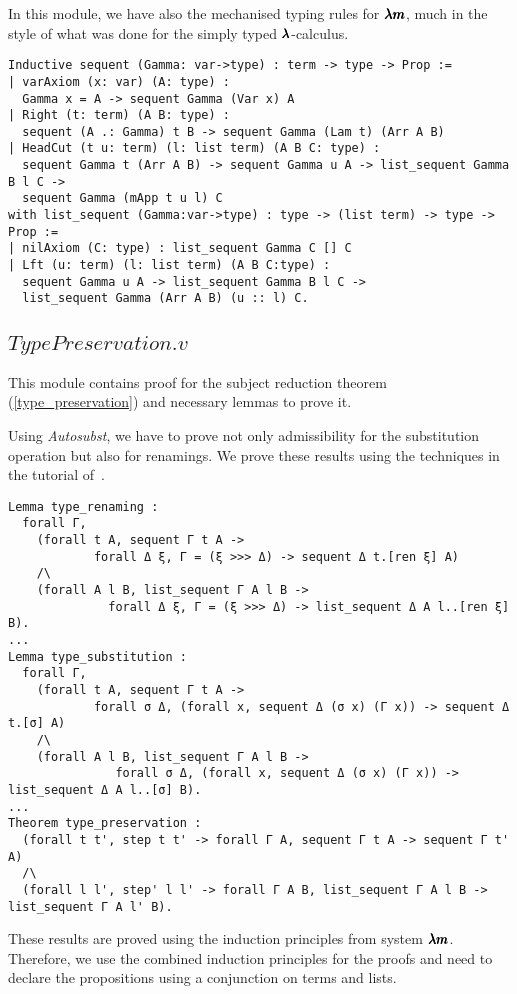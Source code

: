 In this module, we have also the mechanised typing rules for $\pmb{\lambda m}$, much in the style of what was done for the simply typed $\pmb{\lambda}$-calculus.
\begin{lstlisting}[language=Coq]
Inductive sequent (Gamma: var->type) : term -> type -> Prop := 
| varAxiom (x: var) (A: type) :
  Gamma x = A -> sequent Gamma (Var x) A
| Right (t: term) (A B: type) :
  sequent (A .: Gamma) t B -> sequent Gamma (Lam t) (Arr A B)
| HeadCut (t u: term) (l: list term) (A B C: type) :
  sequent Gamma t (Arr A B) -> sequent Gamma u A -> list_sequent Gamma B l C ->
  sequent Gamma (mApp t u l) C
with list_sequent (Gamma:var->type) : type -> (list term) -> type -> Prop :=
| nilAxiom (C: type) : list_sequent Gamma C [] C
| Lft (u: term) (l: list term) (A B C:type) :
  sequent Gamma u A -> list_sequent Gamma B l C ->
  list_sequent Gamma (Arr A B) (u :: l) C.
\end{lstlisting}

\subsection{\lst$TypePreservation.v$}

This module contains proof for the subject reduction theorem (\cref{type_preservation}) and necessary lemmas to prove it.

Using \textit{Autosubst}, we have to prove not only admissibility for the substitution operation but also for renamings.
We prove these results using the techniques in the tutorial of~\cite{AutosubstManual}.
\begin{lstlisting}[language=Coq]
Lemma type_renaming :
  forall Γ,
    (forall t A, sequent Γ t A ->
            forall Δ ξ, Γ = (ξ >>> Δ) -> sequent Δ t.[ren ξ] A)
    /\
    (forall A l B, list_sequent Γ A l B ->
              forall Δ ξ, Γ = (ξ >>> Δ) -> list_sequent Δ A l..[ren ξ] B).
...
Lemma type_substitution :
  forall Γ, 
    (forall t A, sequent Γ t A ->
            forall σ Δ, (forall x, sequent Δ (σ x) (Γ x)) -> sequent Δ t.[σ] A)
    /\
    (forall A l B, list_sequent Γ A l B ->
               forall σ Δ, (forall x, sequent Δ (σ x) (Γ x)) -> list_sequent Δ A l..[σ] B).
...
Theorem type_preservation :
  (forall t t', step t t' -> forall Γ A, sequent Γ t A -> sequent Γ t' A)
  /\
  (forall l l', step' l l' -> forall Γ A B, list_sequent Γ A l B -> list_sequent Γ A l' B).
\end{lstlisting}

These results are proved using the induction principles from system $\pmb{\lambda m}$.
Therefore, we use the combined induction principles for the proofs and need to declare the propositions using a conjunction on terms and lists.

